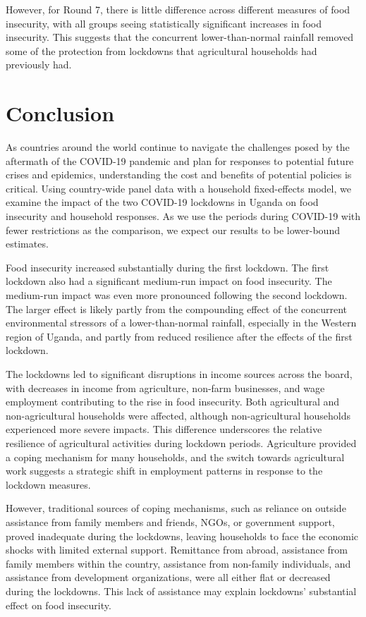 \documentclass{wber}
\begin{document}
However, for Round 7, there is little difference across different
measures of food insecurity, with all groups seeing statistically
significant increases in food insecurity. This suggests that the
concurrent lower-than-normal rainfall removed some of the protection
from lockdowns that agricultural households had previously had.

\section{Conclusion}\label{conclusion}

As countries around the world continue to navigate the challenges posed
by the aftermath of the COVID-19 pandemic and plan for responses to
potential future crises and epidemics, understanding the cost and
benefits of potential policies is critical. Using country-wide panel
data with a household fixed-effects model, we examine the impact of the
two COVID-19 lockdowns in Uganda on food insecurity and household
responses. As we use the periods during COVID-19 with fewer restrictions
as the comparison, we expect our results to be lower-bound estimates.

Food insecurity increased substantially during the first lockdown. The
first lockdown also had a significant medium-run impact on food
insecurity. The medium-run impact was even more pronounced following the
second lockdown. The larger effect is likely partly from the compounding
effect of the concurrent environmental stressors of a lower-than-normal
rainfall, especially in the Western region of Uganda, and partly from
reduced resilience after the effects of the first lockdown.

The lockdowns led to significant disruptions in income sources across
the board, with decreases in income from agriculture, non-farm
businesses, and wage employment contributing to the rise in food
insecurity. Both agricultural and non-agricultural households were
affected, although non-agricultural households experienced more severe
impacts. This difference underscores the relative resilience of
agricultural activities during lockdown periods. Agriculture provided a
coping mechanism for many households, and the switch towards
agricultural work suggests a strategic shift in employment patterns in
response to the lockdown measures.

However, traditional sources of coping mechanisms, such as reliance on
outside assistance from family members and friends, NGOs, or government
support, proved inadequate during the lockdowns, leaving households to
face the economic shocks with limited external support. Remittance from
abroad, assistance from family members within the country, assistance
from non-family individuals, and assistance from development
organizations, were all either flat or decreased during the lockdowns.
This lack of assistance may explain lockdowns' substantial effect on
food insecurity.
\end{document}
